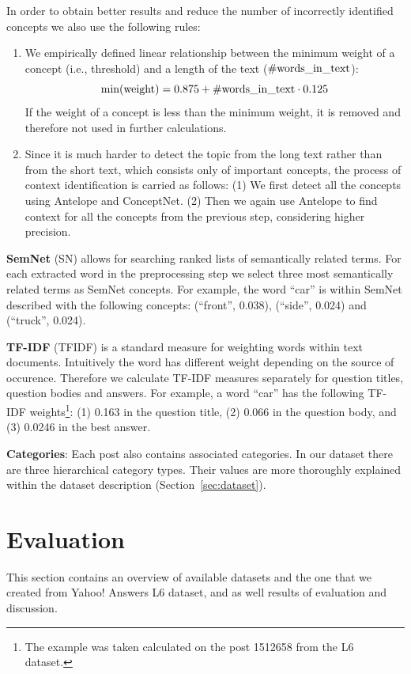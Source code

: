 \documentclass[conference]{IEEEtran}
\newcommand{\secref}[1]{Section~\ref{#1}}
\begin{document}
In order to obtain better results and reduce the number of incorrectly identified concepts we also use the following rules:
\begin{enumerate}
	\item We empirically defined linear relationship between the minimum weight of a concept (i.e., threshold) and a length of the text (${\rm \#words\_in\_text}$):
$$
	{\rm min(weight)} = 0.875 + {\rm \#words\_in\_text} \cdot 0.125
$$
If the weight of a concept is less than the minimum weight, it is removed and therefore not used in further calculations.
	\item Since it is much harder to detect the topic from the long text rather than from the short text, which consists only of important concepts, the process of context identification is carried as follows: (1) We first detect all the concepts using Antelope and ConceptNet. (2) Then we again use Antelope to find context for all the concepts from the previous step, considering higher precision.
\end{enumerate}

{\bf SemNet} (SN) allows for searching ranked lists of semantically related terms. For each extracted word in the preprocessing step we select three most semantically related terms as SemNet concepts. For example, the word ``car'' is within SemNet described with the following concepts: (``front'', 0.038), (``side'', 0.024) and (``truck'', 0.024).

{\bf TF-IDF} (TFIDF) is a standard measure for weighting words within text documents. Intuitively the word has different weight depending on the source of occurence. Therefore we calculate TF-IDF measures separately for question titles, question bodies and answers. For example, a word ``car'' has the following TF-IDF weights\footnote{The example was taken calculated on the post 1512658 from the L6 dataset.}: (1) 0.163 in the question title, (2) 0.066 in the question body, and (3) 0.0246 in the best answer. 

{\bf Categories}:
Each post also contains associated categories. In our dataset there are three hierarchical category types. Their values are more thoroughly explained within the dataset description (\secref{sec:dataset}).

\vspace{-0.3cm}
\section{Evaluation}
This section contains an overview of available datasets and the one that we created from Yahoo! Answers L6 dataset, and as well results of evaluation and discussion.
\end{document}
